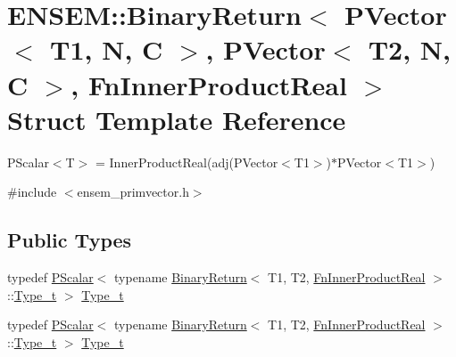 \hypertarget{structENSEM_1_1BinaryReturn_3_01PVector_3_01T1_00_01N_00_01C_01_4_00_01PVector_3_01T2_00_01N_00_468475cad5ee6c317874aa2dbdb6c752}{}\section{E\+N\+S\+EM\+:\+:Binary\+Return$<$ P\+Vector$<$ T1, N, C $>$, P\+Vector$<$ T2, N, C $>$, Fn\+Inner\+Product\+Real $>$ Struct Template Reference}
\label{structENSEM_1_1BinaryReturn_3_01PVector_3_01T1_00_01N_00_01C_01_4_00_01PVector_3_01T2_00_01N_00_468475cad5ee6c317874aa2dbdb6c752}


P\+Scalar$<$\+T$>$ = Inner\+Product\+Real(adj(\+P\+Vector$<$\+T1$>$)$\ast$\+P\+Vector$<$\+T1$>$)  




{\ttfamily \#include $<$ensem\+\_\+primvector.\+h$>$}

\subsection*{Public Types}
\begin{DoxyCompactItemize}
\item 
typedef \mbox{\hyperlink{classENSEM_1_1PScalar}{P\+Scalar}}$<$ typename \mbox{\hyperlink{structENSEM_1_1BinaryReturn}{Binary\+Return}}$<$ T1, T2, \mbox{\hyperlink{structENSEM_1_1FnInnerProductReal}{Fn\+Inner\+Product\+Real}} $>$\+::\mbox{\hyperlink{structENSEM_1_1BinaryReturn_3_01PVector_3_01T1_00_01N_00_01C_01_4_00_01PVector_3_01T2_00_01N_00_468475cad5ee6c317874aa2dbdb6c752_a90d242abe1e521e266bcd13cbaf17e35}{Type\+\_\+t}} $>$ \mbox{\hyperlink{structENSEM_1_1BinaryReturn_3_01PVector_3_01T1_00_01N_00_01C_01_4_00_01PVector_3_01T2_00_01N_00_468475cad5ee6c317874aa2dbdb6c752_a90d242abe1e521e266bcd13cbaf17e35}{Type\+\_\+t}}
\item 
typedef \mbox{\hyperlink{classENSEM_1_1PScalar}{P\+Scalar}}$<$ typename \mbox{\hyperlink{structENSEM_1_1BinaryReturn}{Binary\+Return}}$<$ T1, T2, \mbox{\hyperlink{structENSEM_1_1FnInnerProductReal}{Fn\+Inner\+Product\+Real}} $>$\+::\mbox{\hyperlink{structENSEM_1_1BinaryReturn_3_01PVector_3_01T1_00_01N_00_01C_01_4_00_01PVector_3_01T2_00_01N_00_468475cad5ee6c317874aa2dbdb6c752_a90d242abe1e521e266bcd13cbaf17e35}{Type\+\_\+t}} $>$ \mbox{\hyperlink{structENSEM_1_1BinaryReturn_3_01PVector_3_01T1_00_01N_00_01C_01_4_00_01PVector_3_01T2_00_01N_00_468475cad5ee6c317874aa2dbdb6c752_a90d242abe1e521e266bcd13cbaf17e35}{Type\+\_\+t}}
\end{DoxyCompactItemize}


